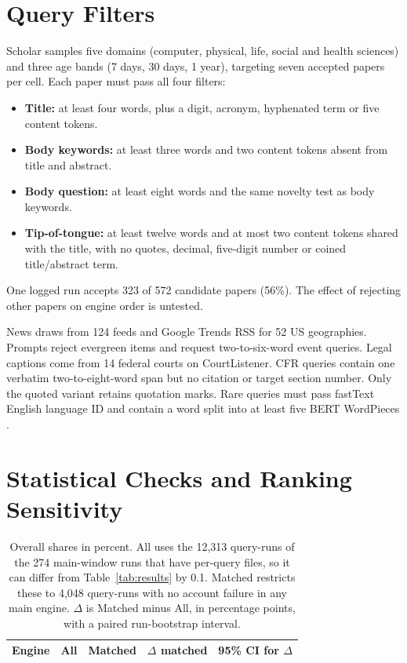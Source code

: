 \documentclass[11pt]{article}
\begin{document}
\section{Query Filters}
\label{app:leak}

Scholar samples five domains (computer, physical, life, social and health
sciences) and three age bands (7 days, 30 days, 1 year), targeting seven
accepted papers per cell. Each paper must pass
all four filters:
\begin{itemize}[nosep,leftmargin=1.2em]
\item \textbf{Title:} at least four words, plus a digit, acronym,
  hyphenated term or five content tokens.
\item \textbf{Body keywords:} at least three words and two content
  tokens absent from title and abstract.
\item \textbf{Body question:} at least eight words and the same novelty
  test as body keywords.
\item \textbf{Tip-of-tongue:} at least twelve words and at most two
  content tokens shared with the title, with no quotes, decimal,
  five-digit number or coined title/abstract term.
\end{itemize}
One logged run accepts 323 of 572 candidate papers (56\%).
The effect of rejecting other papers on engine order is untested.

News draws from 124 feeds and Google Trends RSS for 52 US geographies.
Prompts reject evergreen items and request two-to-six-word event queries.
Legal captions come from 14 federal courts on CourtListener. CFR queries
contain one verbatim two-to-eight-word span but no citation or target
section number. Only the quoted variant retains quotation marks.
Rare queries must pass fastText English language ID
\citep{joulin2017bag,joulin2016fasttextzip} and contain a word split into
at least five BERT WordPieces \citep{wu2016gnmt,devlin2019bert}.

\section{Statistical Checks and Ranking Sensitivity}
\label{app:checks}

\begin{table}[t]
\centering\footnotesize
\setlength{\tabcolsep}{3pt}
\begin{tabular}{@{}lrrll@{}}
\toprule
Engine & All & Matched & $\Delta$ matched & 95\% CI for $\Delta$ \\
\midrule

\bottomrule
\end{tabular}
\caption{Overall shares in percent. All uses the 12,313 query-runs of the
274 main-window runs that have per-query files, so it can differ from
Table~\ref{tab:results} by 0.1. Matched restricts these to 4,048
query-runs with no account failure in any main engine. $\Delta$ is
Matched minus All, in percentage points, with a paired run-bootstrap
interval.}
\label{tab:ci}
\end{table}
\end{document}
